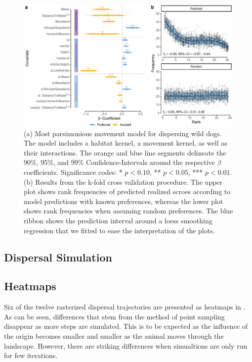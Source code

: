 \documentclass[abstract=on,10pt,a4paper,bibliography=totocnumbered]{article}
\begin{document}
\begin{figure}
  \begin{center}
    \includegraphics[width=\textwidth]{99_MovementModel}
    \caption{(a) Most parsimonious movement model for dispersing wild dogs. The
    model includes a habitat kernel, a movement kernel, as well as their
    interactions. The orange and blue line segments delineate the 90\%, 95\%,
    and 99\% Confidence-Intervals around the respective \(\beta\) coefficients.
    Significance codes: * \(p < 0.10\), ** \(p < 0.05\), *** \(p < 0.01\). (b)
    Results from the k-fold cross validation procedure. The upper plot shows
    rank frequencies of predicted realized scroes according to model predictions
    with known preferences, whereas the lower plot shows rank frequencies when
    assuming random preferences. The blue ribbon shows the prediction interval
    around a loess smoothing regression that we fitted to ease the
    interpretation of the plots.}
    \label{MovementModel}
  \end{center}
\end{figure}

\subsection{Dispersal Simulation}

\subsection{Heatmaps}
Six of the twelve rasterized dispersal trajectories are presented as heatmaps in
. As can be seen, differences that stem from the method of point
sampling disappear as more steps are simulated. This is to be expected as the
influence of the origin becomes smaller and smaller as the animal moves through
the landscape. However, there are striking differences when simualtions are only
run for few iterations.
\end{document}
